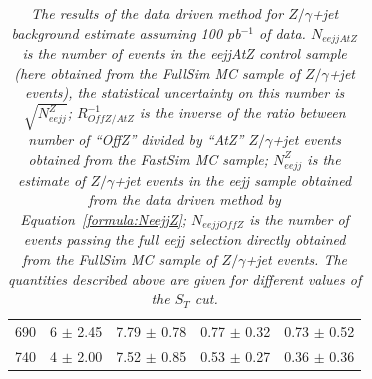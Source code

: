 \begin{table}[htbp]
\begin{center}
\begin{tabular}{||c||c|c|c||c||}
   690  &       6  $\pm$    2.45  &    7.79  $\pm$    0.78  &    0.77  $\pm$    0.32  &    0.73  $\pm$    0.52  \\ 
   740  &       4  $\pm$    2.00  &    7.52  $\pm$    0.85  &    0.53  $\pm$    0.27  &    0.36  $\pm$    0.36  \\ 
\hline\hline
\end{tabular}
\end{center}
\caption{\small \sl The results of the data driven method for $Z/\gamma$+jet background 
estimate assuming 100 pb$^{-1}$ of data. $N_{eejjAtZ}$ is the number of events in the eejjAtZ control sample 
(here obtained from the FullSim MC sample of $Z/\gamma$+jet events), the statistical uncertainty 
on this number is $\sqrt{N_{eejj}^{Z}}$; $R_{OffZ/AtZ}^{-1}$ is the inverse of the 
ratio between number of ``OffZ'' divided by ``AtZ'' $Z/\gamma$+jet events obtained from the FastSim MC sample; 
$N_{eejj}^{Z}$ is the estimate of $Z/\gamma$+jet events in the eejj sample obtained from the data driven method by 
Equation~\ref{formula:NeejjZ}; $N_{eejjOffZ}$ is the number of 
events passing the full eejj selection directly obtained from the FullSim MC sample of $Z/\gamma$+jet events. 
The quantities described above are given for different values of the $S_T$ cut.}
\label{tab:ZjetClosureTest}
\end{table}






